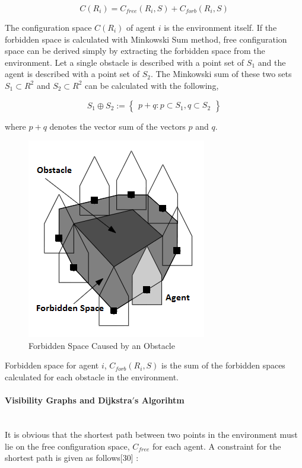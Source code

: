 \begin{equation}
C(R_i) = C_{free}(R_i,S) + C_{forb}(R_i,S)
\end{equation}

The configuration space $C(R_i)$ of agent $i$ is the environment itself. If the forbidden space is calculated with Minkowski Sum method, free configuration space can be derived simply by extracting the forbidden space from the environment. Let a single obstacle is described with a point set of $S_1$ and the agent is described with a point set of $S_2$. The Minkowski sum of these two sets $S_1 \subset R^2$ and $S_2 \subset R^2$ can be calculated with the following,
	
\begin{equation}
S_1 \oplus S_2 := \begin{Bmatrix}
p+q : p \subset S_1, q \subset S_2
\end{Bmatrix} 
\end{equation}

where $p+q$ denotes the vector sum of the vectors $p$ and $q$.
		
\begin{figure}[H]
\caption{Forbidden Space Caused by an Obstacle}
\centering
\includegraphics[scale = 0.4]{Forbidden}
\end{figure}
	
Forbidden space for agent $i$, $C_{forb}(R_i, S)$ is the sum of the forbidden spaces calculated for each obstacle in the environment. 
	
\paragraph{Visibility Graphs and Dijkstra$'$s Algorihtm}\hspace{0pt} \\
It is obvious that the shortest path between two points in the environment must lie on the free configuration space, $C_{free}$ for each agent. A constraint for the shortest path is given as follows[30] : 

